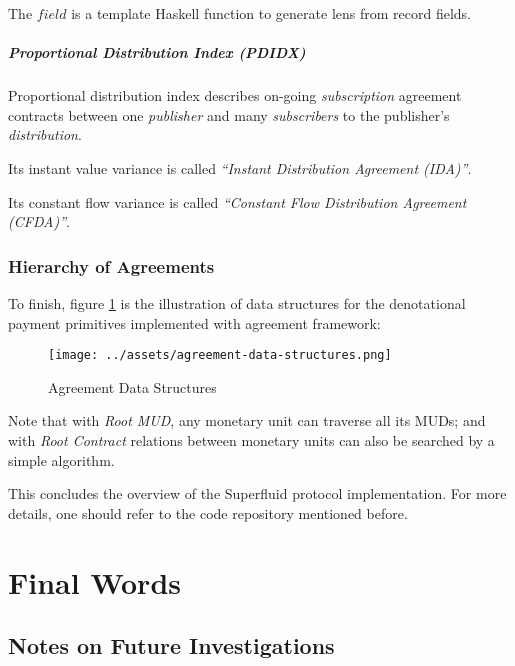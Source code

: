 The $field$ is a template Haskell function to generate lens from record fields.

\paragraph{Proportional Distribution Index (PDIDX)}

Proportional distribution index describes on-going \textit{subscription} agreement contracts between
one \textit{publisher} and many \textit{subscribers} to the publisher's \textit{distribution}.

Its instant value variance is called \textit{``Instant Distribution Agreement (IDA)''}.

Its constant flow variance is called \textit{``Constant Flow Distribution Agreement (CFDA)''}.

\subsection{Hierarchy of Agreements}

To finish, figure \ref{fig:ac-agreement-data-structures} is the illustration of data structures for
the denotational payment primitives implemented with agreement framework:

\begin{figure}[p]
    \centering
    \texttt{[image: ../assets/agreement-data-structures.png]}
    \caption{Agreement Data Structures}
    \label{fig:ac-agreement-data-structures}
\end{figure}

Note that with \textit{Root MUD}, any monetary unit can traverse all its MUDs; and with \textit{Root
Contract} relations between monetary units can also be searched by a simple algorithm.

This concludes the overview of the Superfluid protocol implementation. For more details, one should
refer to the code repository mentioned before.

\chapter{Final Words}

\section{Notes on Future Investigations}

